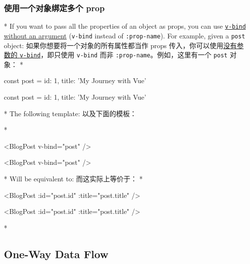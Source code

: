 \begin{paracol}{2}
\subsubsection{使用一个对象绑定多个 prop}
\switchcolumn[0]*%
If you want to pass all the properties of an object as props, you can
use
\href{https://vuejs.org/guide/essentials/template-syntax.html\#dynamically-binding-multiple-attributes}{\texttt{v-bind}
without an argument} (\texttt{v-bind} instead of \texttt{:prop-name}).
For example, given a \texttt{post} object:
\switchcolumn
如果你想要将一个对象的所有属性都当作 props
传入，你可以使用\href{https://cn.vuejs.org/guide/essentials/template-syntax.html\#dynamically-binding-multiple-attributes}{没有参数的
\texttt{v-bind}}，即只使用 \texttt{v-bind} 而非
\texttt{:prop-name}。例如，这里有一个 \texttt{post} 对象：
\switchcolumn[0]*%
\begin{codeJs}
const post = {
  id: 1,
  title: 'My Journey with Vue'
}
\end{codeJs}
\switchcolumn
\begin{codeJs}
const post = {
  id: 1,
  title: 'My Journey with Vue'
}
\end{codeJs}
\switchcolumn[0]*%
The following template:
\switchcolumn
以及下面的模板：

\switchcolumn[0]*%
\begin{codeHtml}
<BlogPost v-bind="post" />
\end{codeHtml}
\switchcolumn
\begin{codeHtml}
<BlogPost v-bind="post" />
\end{codeHtml}
\switchcolumn[0]*%
Will be equivalent to:
\switchcolumn
而这实际上等价于：
\switchcolumn[0]*%
\begin{codeHtml}
<BlogPost :id="post.id" :title="post.title" />
\end{codeHtml}
\switchcolumn
\begin{codeHtml}
<BlogPost :id="post.id" :title="post.title" />
\end{codeHtml}
\switchcolumn[0]*%
\subsection{One-Way Data Flow}
\switchcolumn

\end{paracol}
